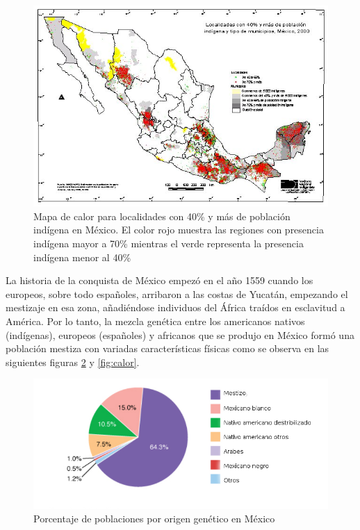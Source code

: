 \begin{figure}[H]
  \centering
  \includegraphics[scale=0.5]{mapa_003.jpg}
  \caption[Mapa de Calor para localidades ind\'igena en M\'exico]{Mapa de calor para localidades con 40\% y m\'as de poblaci\'on ind\'igena en M\'exico. El color rojo muestra las regiones con presencia ind\'igena mayor a 70\% mientras el verde representa la presencia ind\'igena menor al 40\% \cite{CNDPI}}
  \label{fig:indigena}
\end{figure}

La historia de la conquista de M\'exico empez\'o en el año 1559 cuando los europeos, sobre todo españoles, arribaron a las costas de Yucat\'an, empezando el mestizaje en esa zona, añadi\'endose individuos del \'Africa tra\'idos en esclavitud a Am\'erica. Por lo tanto, la mezcla gen\'etica entre los americanos nativos (ind\'igenas), europeos (españoles) y africanos que se produjo en M\'exico form\'o una poblaci\'on mestiza con variadas caracter\'isticas f\'isicas \cite{carlos, Gabriela} como se observa en las siguientes figuras \ref{fig:indi} y \ref{fig:calor}. \\


\begin{figure}[H]
  \centering
  \includegraphics[scale=0.5]{etnia.png}
  \caption[Porcentaje de poblaciones por origen gen\'etico en M\'exico]{Porcentaje de poblaciones por origen gen\'etico en M\'exico \cite{Cat} }
  \label{fig:indi}
\end{figure}


